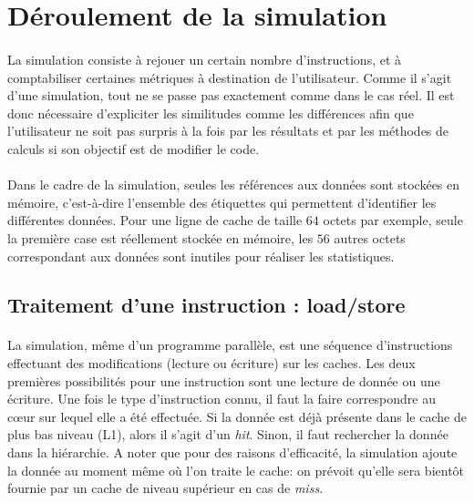 \section{Déroulement de la simulation}

\paragraph{}
La simulation consiste à rejouer un certain nombre d'instructions, et à comptabiliser certaines métriques à destination de l'utilisateur. Comme il s'agit d'une simulation, tout ne se passe pas exactement comme dans le cas réel. Il est donc nécessaire d'expliciter les similitudes comme les différences afin que l'utilisateur ne soit pas surpris à la fois par les résultats et par les méthodes de calculs si son objectif est de modifier le code.

\paragraph{}
Dans le cadre de la simulation, seules les références aux données sont stockées en mémoire, c'est-à-dire l'ensemble des étiquettes qui permettent d'identifier les différentes données. Pour une ligne de cache de taille $64$ octets par exemple, seule la première case est réellement stockée en mémoire, les $56$ autres octets correspondant aux données sont inutiles pour réaliser les statistiques.

\subsection{Traitement d'une instruction : load/store}

\paragraph{}
La simulation, même d'un programme parallèle, est une séquence d'instructions effectuant des modifications (lecture ou écriture) sur les caches. Les deux premières possibilités pour une instruction sont une lecture de donnée ou une écriture. Une fois le type d'instruction connu, il faut la faire correspondre au c{\oe}ur sur lequel elle a été effectuée. Si la donnée est déjà présente dans le cache de plus bas niveau (L1), alors il s'agit d'un \emph{hit}. Sinon, il faut rechercher la donnée dans la hiérarchie. A noter que pour des raisons d'efficacité, la simulation ajoute la donnée au moment même où l'on traite le cache: on prévoit qu'elle sera bientôt fournie par un cache de niveau supérieur en cas de \emph{miss}.

